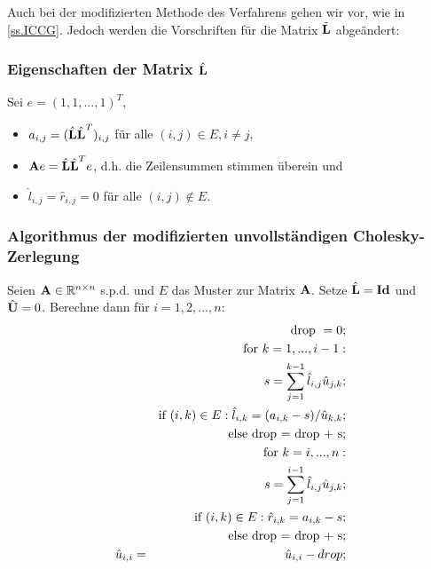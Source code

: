 Auch bei der modifizierten Methode des Verfahrens gehen wir vor, wie in \autoref{ss.ICCG}. Jedoch werden die Vorschriften für die Matrix $\tilde{{\textbf{L}}}$ abgeändert:

\subsubsection{Eigenschaften der Matrix $\hat{{\textbf{L}}}$}\label{sss.Eigenschaften L MCZ}

Sei $e = (1,1,...,1)^{T}$,

\begin{itemize}
\item $a_{i,j} = (\hat{{\textbf{L}}} \hat{{\textbf{L}}}^{T})_{i,j}$ für alle $(i,j) \in E, i \ne j$,
\item ${\textbf{A}} e = \hat{{\textbf{L}}} \hat{{\textbf{L}}}^{T} e$, d.h. die Zeilensummen stimmen überein und
\item $\hat l_{i,j} = \hat r_{i,j} = 0$ für alle $(i,j) \notin E$.
\end{itemize}

\subsubsection{Algorithmus der modifizierten unvollständigen Cholesky-Zerlegung}\label{sss.Algorithmus MUCZ}

Seien ${\textbf{A}} \in \mathbb{R}^{n \times n}$ s.p.d. und $E$ das Muster zur Matrix ${\textbf{A}}$. Setze $\hat{{\textbf{L}}} = {\textbf{Id}}$ und $\hat{{\textbf{U}}} = 0$. Berechne dann für $i=1,2,...,n$:
\begin{eqnarray}
&&\textnormal{drop } = 0;\notag\\
&&\textnormal{for } k = 1,...,i-1:\notag\\
&&s = \sum_{j=1}^{k-1} \hat l_{i,j} \hat u_{j,k};\notag\\
&&\textnormal{if } (i,k) \in E: \hat l_{i,k} = (a_{i,k} - s)/ \hat u_{k,k};\notag\\
&&\textnormal{else drop = drop + s};\notag \\
&&\textnormal{for } k = i,...,n: \notag \\
&&s = \sum_{j=1}^{i-1} \hat l_{i,j} \hat u_{j,k};\notag\\
&&\textnormal{if } (i,k) \in E: \hat r_{i,k} = a_{i,k} - s; \notag\\
&&\textnormal{else drop = drop + s};\notag \\
\hat u_{i,i} &=& \hat u_{i,i} -drop;
\end{eqnarray}

